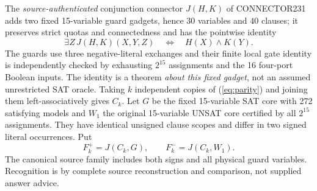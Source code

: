 \documentclass[10pt]{article}
\begin{document}
\noindent The \emph{source-authenticated} conjunction connector $J(H,K)$ of CONNECTOR231 adds two fixed 15-variable guard gadgets, hence $30$ variables and $40$ clauses; it preserves strict quotas and connectedness and has the pointwise identity
\begin{equation}\label{eq:connector}
\exists Z\,J(H,K)(X,Y,Z)\quad\Longleftrightarrow\quad H(X)\land K(Y).
\end{equation}
The guards use three negative-literal exchanges and their finite local gate identity is independently checked by exhausting $2^{15}$ assignments and the 16 four-port Boolean inputs. The identity is a theorem \emph{about this fixed gadget}, not an assumed unrestricted SAT oracle. Taking $k$ independent copies of (\ref{eq:parity}) and joining them left-associatively gives $C_k$. Let $G$ be the fixed 15-variable SAT core with 272 satisfying models and $W_1$ the original 15-variable UNSAT core certified by all $2^{15}$ assignments. They have identical unsigned clause scopes and differ in two signed literal occurrences. Put
\[F_k^+=J(C_k,G),\qquad F_k^-=J(C_k,W_1).\]
The canonical source family includes both signs and all physical guard variables. Recognition is by complete source reconstruction and comparison, not supplied answer advice.
\end{document}
